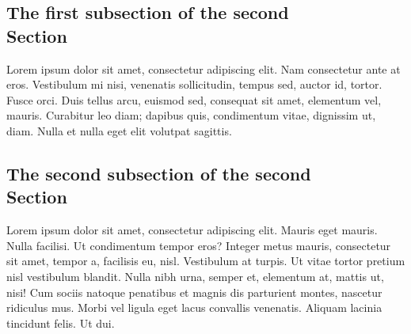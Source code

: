 \documentclass[a4paper,10pt]{article}
\begin{document}
\begin{multicols}{2}
\subsection{The first subsection of the second \\ Section}

Lorem ipsum dolor sit amet, consectetur adipiscing elit. Nam consectetur ante at
eros. Vestibulum mi nisi, venenatis sollicitudin, tempus sed, auctor id, tortor.
Fusce orci. Duis tellus arcu, euismod sed, consequat sit amet, elementum vel,
mauris. Curabitur leo diam; dapibus quis, condimentum vitae, dignissim ut, diam.
Nulla et nulla eget elit volutpat sagittis.

\subsection{The second subsection of the second \\ Section}

Lorem ipsum dolor sit amet, consectetur adipiscing elit. Mauris eget mauris.
Nulla facilisi. Ut condimentum tempor eros? Integer metus mauris, consectetur
sit amet, tempor a, facilisis eu, nisl. Vestibulum at turpis. Ut vitae tortor
pretium nisl vestibulum blandit. Nulla nibh urna, semper et, elementum at,
mattis ut, nisi! Cum sociis natoque penatibus et magnis dis parturient montes,
nascetur ridiculus mus. Morbi vel ligula eget lacus convallis venenatis. Aliquam
lacinia tincidunt felis. Ut dui.




\end{multicols}
\end{document}
